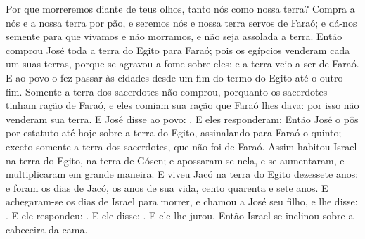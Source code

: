 {{{  Por que morreremos diante de teus olhos, tanto nós como nossa terra? Compra a nós e a nossa terra por pão, e seremos nós e nossa terra servos de Faraó; e dá-nos semente para que vivamos e não morramos, e não seja assolada a terra}.
  Então comprou José toda a terra do Egito para Faraó; pois os egípcios venderam cada um suas terras, porque se agravou a fome sobre eles: e a terra veio a ser de Faraó.
  E ao povo o fez passar às cidades desde um fim do termo do Egito até o outro fim.
  Somente a terra dos sacerdotes não comprou, porquanto os sacerdotes tinham ração de Faraó, e eles comiam sua ração que Faraó lhes dava: por isso não venderam sua terra.
  E José disse ao povo: .
  E eles responderam: 
  Então José o pôs por estatuto até hoje sobre a terra do Egito, assinalando para Faraó o quinto; exceto somente a terra dos sacerdotes, que não foi de Faraó.
  Assim habitou Israel na terra do Egito, na terra de Gósen; e apossaram-se nela, e se aumentaram, e multiplicaram em grande maneira. %
  E viveu Jacó na terra do Egito dezessete anos: e foram os dias de Jacó, os anos de sua vida, cento quarenta e sete anos.
  E achegaram-se os dias de Israel para morrer, e chamou a José seu filho, e lhe disse: . E ele respondeu: . %
  E ele disse: . E ele lhe jurou. Então Israel se inclinou sobre a cabeceira da cama.
\par }

}
